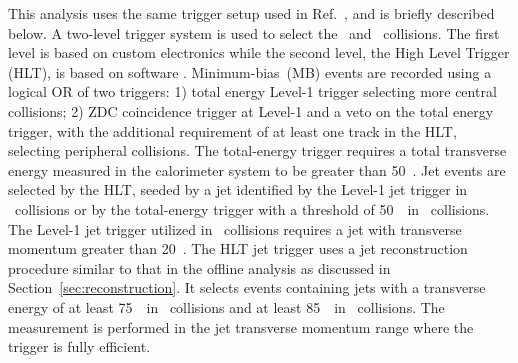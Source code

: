 This analysis uses the same trigger setup used in Ref.~\cite{Aaboud:2018hpb}, and is briefly described below.
A two-level trigger system is used to select the \PbPb\ and \pp\ collisions.
The first level is based on custom electronics while the second level, the High Level Trigger (HLT), is based on software \cite{Aaboud:2016leb}.
Minimum-bias~(MB) events are recorded using a logical OR of two triggers: 1) total energy Level-1 trigger selecting more central collisions; 2) ZDC coincidence trigger at Level-1 and a veto on the total energy trigger, with the additional requirement of at least one track in the HLT, selecting peripheral collisions.
The total-energy trigger requires a total transverse energy measured in the calorimeter system to be greater than 50~\GeV.
Jet events are selected by the HLT, seeded by a jet identified by the Level-1 jet trigger in \pp\ collisions or by the total-energy trigger with a threshold of 50~\GeV\ in \PbPb\ collisions.
The Level-1 jet trigger utilized in \pp\ collisions requires a jet with transverse momentum greater than 20~\GeV.
The HLT jet trigger uses a jet reconstruction procedure similar to that in the offline analysis as discussed in Section~\ref{sec:reconstruction}.
It selects events containing jets with a transverse energy of at least 75~\GeV\ in \PbPb\ collisions and at least 85~\GeV\ in \pp\ collisions.
The measurement is performed in the jet transverse momentum range where the trigger is fully efficient.




